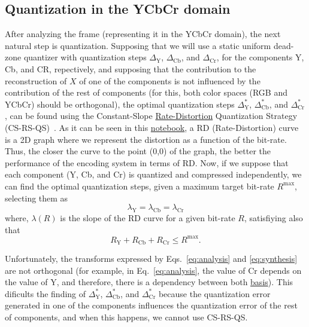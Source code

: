 \subsection{Quantization in the YCbCr domain}
After analyzing the frame (representing it in the YCbCr domain), the
next natural step is quantization. Supposing that we will use a static
uniform dead-zone quantizer with quantization steps
$\Delta_{\text{Y}}$, $\Delta_{\text{Cb}}$, and $\Delta_{\text{Cr}}$,
for the components Y, Cb, and CR, repectively, and supposing that the
contribution to the reconstruction of $X$ of one of the components is
not influenced by the contribution of the rest of components (for
this, both color spaces (RGB and YCbCr) should be orthogonal), the
optimal quantization steps $\Delta^*_{\text{Y}}$,
$\Delta^*_{\text{Cb}}$, and $\Delta^*_{\text{Cr}}$, can be found using
the Constant-Slope
\href{https://en.wikipedia.org/wiki/Rate-distortion_theory}{Rate-Distortion}
Quantization Strategy
(CS-RS-QS)~\cite{vetterli1995wavelets,sayood2017introduction}. As it
can be seen in this
\href{https://github.com/Sistemas-Multimedia/Sistemas-Multimedia.github.io/blob/master/study_guide/06-color_transform/performance.ipynb}{notebook},
a RD (Rate-Distortion) curve is a 2D graph where we represent the
distortion as a function of the bit-rate. Thus, the closer the curve
to the point (0,0) of the graph, the better the performance of the
encoding system in terms of RD. Now, if we suppose that each component
(Y, Cb, and Cr) is quantized and compressed independently, we can find
the optimal quantization steps, given a maximum target bit-rate
$R^{\text{max}}$, selecting them as
\begin{equation}
  \lambda_{\text{Y}} = \lambda_{\text{Cb}} = \lambda_{\text{Cr}}
\end{equation}
where, $\lambda(R)$ is the slope of the RD curve for a given bit-rate
$R$, satisfiying also that
\begin{equation}
  R_{\text{Y}} + R_{\text{Cb}} + R_{\text{Cr}} \le R^{\text{max}}.
\end{equation}

Unfortunately, the transforms expressed by Eqs.~\ref{eq:analysis} and
\ref{eq:synthesis} are not orthogonal (for example, in
Eq.~\ref{eq:analysis}, the value of Cr depends on the value of Y, and
therefore, there is a dependency between both
\href{https://en.wikipedia.org/wiki/Basis_(linear_algebra)}{basis}). This
dificults the finding of $\Delta^*_{\text{Y}}$,
$\Delta^*_{\text{Cb}}$, and $\Delta^*_{\text{Cr}}$ because the
quantization error generated in one of the components influences
the quantization error of the rest of components, and when this
happens, we cannot use CS-RS-QS.

